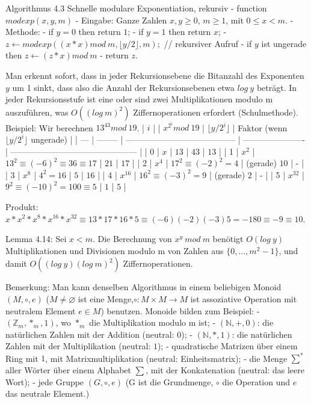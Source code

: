 \documentclass[a4paper]{article}
\begin{document}
\begin{multicols}{3}
Algorithmus 4.3 Schnelle modulare Exponentiation, rekursiv
- function $modexp(x,y,m)$
- Eingabe: Ganze Zahlen $x,y\geq 0$, $m\geq 1$, mit $0\leq x < m$.
- Methode:
  - if $y= 0$ then return $1$;
  - if $y= 1$ then return $x$;
  - $z\leftarrow modexp((x*x) mod\ m,\lfloor y/2\rfloor,m);$ // rekursiver Aufruf
  - if $y$ ist ungerade then $z\leftarrow (z*x) mod\ m$
  - return $z$.

Man erkennt sofort, dass in jeder Rekursionsebene die Bitanzahl des Exponenten $y$ um 1 sinkt, dass also die Anzahl der Rekursionsebenen etwa $log\ y$ beträgt. In jeder Rekursionsstufe ist eine oder sind zwei Multiplikationen modulo m auszuführen, was $O((log\ m)^2)$ Ziffernoperationen erfordert (Schulmethode).
Beispiel: Wir berechnen $13^{43} mod\ 19$.
| $i$ |          | $x^{2^i} mod\ 19$                       | $\lfloor y/2^i\rfloor$ | Faktor (wenn $\lfloor y/2^i\rfloor$ ungerade) |
| --- | -------- | --------------------------------------- | ---------------------- | --------------------------------------------- |
| 0   | $x$      | $13$                                    | $43$                   | $13$                                          |
| 1   | $x^2$    | $13^2 \equiv (-6)^2 \equiv 36\equiv 17$ | $21$                   | $17$                                          |
| 2   | $x^4$    | $17^2 \equiv (-2)^2 = 4$                | (gerade) $10$          | -                                             |
| 3   | $x^8$    | $4^2 = 16$                              | $5$                    | $16$                                          |
| 4   | $x^{16}$ | $16^2 \equiv (-3)^2 = 9$                | (gerade) $2$           | -                                             |
| 5   | $x^{32}$ | $9^2 \equiv (-10)^2 = 100\equiv 5$      | $1$                    | $5$                                           |

Produkt: $x*x^2 *x^8 *x^{16} *x^{32} \equiv 13*17*16*5\equiv (-6)(-2)(-3)5 = -180\equiv -9\equiv 10$.

Lemma 4.14: Sei $x<m$. Die Berechnung von $x^y\ mod\ m$ benötigt $O(log\ y)$ Multiplikationen und Divisionen modulo m von Zahlen aus $\{0,...,m^2-1\}$, und damit $O((log\ y)(log\ m)^2)$ Ziffernoperationen.

Bemerkung: Man kann denselben Algorithmus in einem beliebigen Monoid $(M,\circ,e)$ ($M\not=\varnothing$ ist eine Menge,$\circ:M\times M \rightarrow M$ ist assoziative Operation mit neutralem Element $e\in M$) benutzen. Monoide bilden zum Beispiel:
- $(\mathbb{Z}_m ,*_m,1)$, wo $*_m$ die Multiplikation modulo m ist;
- $(\mathbb{N},+,0)$: die natürlichen Zahlen mit der Addition (neutral: $0$);
- $(\mathbb{N},*,1)$: die natürlichen Zahlen mit der Multiplikation (neutral: $1$);
- quadratische Matrizen über einem Ring mit $1$, mit Matrixmultiplikation (neutral: Einheitsmatrix);
- die Menge $\sum^*$ aller Wörter über einem Alphabet $\sum$, mit der Konkatenation (neutral: das leere Wort);
- jede Gruppe $(G,\circ,e)$ (G ist die Grundmenge, $\circ$ die Operation und $e$ das neutrale Element.)


\end{multicols}
\end{document}
